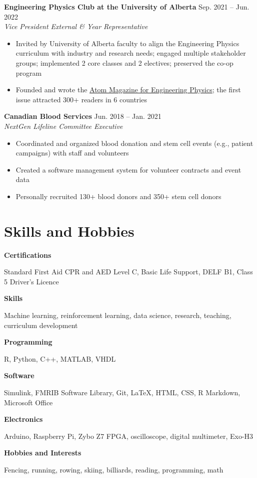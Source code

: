 \documentclass{article}
\begin{document}
\textbf{Engineering Physics Club at the University of Alberta} \hfill Sep. 2021 -- Jun. 2022 \\
\textit{Vice President External \& Year Representative}
\begin{itemize}
    \item Invited by University of Alberta faculty to align the Engineering Physics curriculum with industry and research needs; engaged multiple stakeholder groups; implemented 2 core classes and 2 electives; preserved the co-op program
    \item Founded and wrote the \href{https://atom-winter-2022.netlify.app/}{Atom Magazine for Engineering Physics}; the first issue attracted 300+ readers in 6 countries
\end{itemize} \vspace{1em}

\textbf{Canadian Blood Services} \hfill Jun. 2018 -- Jan. 2021 \\
\textit{NextGen Lifeline Committee Executive}
\begin{itemize}
    \item Coordinated and organized blood donation and stem cell events (e.g., patient campaigns) with staff and volunteers
    \item Created a software management system for volunteer contracts and event data
    \item Personally recruited 130+ blood donors and 350+ stem cell donors
\end{itemize}


\section*{\textcolor{my_colour}{Skills and Hobbies}}
\vspace{-.25em} \hrulefill \vspace{.25em}

\textbf{Certifications} \hfill \parbox[t]{.8\linewidth}{Standard First Aid CPR and AED Level C, Basic Life Support, DELF B1, Class 5 Driver's Licence}

\textbf{Skills} \hfill \parbox[t]{.8\linewidth}{Machine learning, reinforcement learning, data science, research, teaching, curriculum development}

\textbf{Programming} \hfill \parbox[t]{.8\linewidth}{R, Python, C++, MATLAB, VHDL}

\textbf{Software} \hfill \parbox[t]{0.8\linewidth}{Simulink, FMRIB Software Library, Git, \LaTeX, HTML, CSS, R Markdown, Microsoft Office}

\textbf{Electronics} \hfill \parbox[t]{0.8\linewidth}{Arduino, Raspberry Pi, Zybo Z7 FPGA, oscilloscope, digital multimeter, Exo-H3}

\textbf{Hobbies and Interests} \hfill \parbox[t]{.8\linewidth}{Fencing, running, rowing, skiing, billiards, reading, programming, math}
\end{document}
